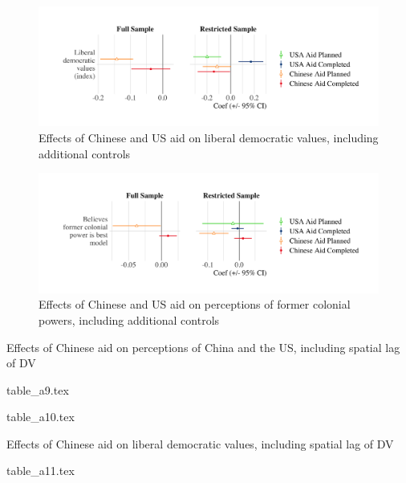 \documentclass[9pt]{article}
\begin{document}
\begin{figure}[H]
\centering
\includegraphics[width=1\textwidth]{figures/figure_a14.png} %
\caption{Effects of Chinese and US aid on liberal democratic values, including additional controls}
\end{figure}

\begin{figure}[H]
\centering
\includegraphics[width=1\textwidth]{figures/figure_a15.png} %
\caption{Effects of Chinese and US aid on perceptions of former colonial powers, including additional controls}
\end{figure}


\newpage %

\setlength{\tabcolsep}{5pt}
\begin{table}[H]
\caption{Effects of Chinese aid on perceptions of China and the US, including spatial lag of DV}
\label{reg}
\centering
{table_a9.tex} %
\end{table}

\noindent {}
{table_a10.tex} %

\newpage %

\setlength{\tabcolsep}{5pt}
\begin{table}[H]
\caption{Effects of Chinese aid on liberal democratic values, including spatial lag of DV}
\label{reg}
\centering
{table_a11.tex} %
\end{table}
\end{document}
